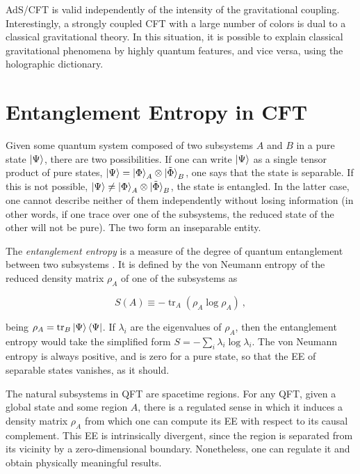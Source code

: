 \documentclass[twocolumn]{revtex4}
\providecommand{\eq}[2]{
    \begin{equation}
        #2
    \label{eq:#1}
    \end{equation}
}
\DeclareMathOperator{\tr}{tr}
\begin{document}
AdS/CFT is valid independently of the intensity of the gravitational coupling. Interestingly, a strongly coupled CFT with a large number of colors is dual to a classical gravitational theory. %
In this situation, it is possible to explain classical gravitational phenomena by highly quantum features, and vice versa, using the holographic dictionary.


\section{Entanglement Entropy in CFT} \label{s:EE_CFT}

Given some quantum system composed of two subsystems $A$ and $B$ in a pure state $\ket{\Psi}$, there are two possibilities. If one can write $\ket{\Psi}$ as a single tensor product of pure states, $\ket{\Psi} = \ket{\Phi}_A \otimes \ket{\tilde{\Phi}}_B$, one says that the state is separable. If this is not possible, $\ket{\Psi} \neq \ket{\Phi}_A \otimes \ket{\tilde{\Phi}}_B$, the state is entangled.
In the latter case, one cannot describe neither of them independently without losing information (in other words, if one trace over one of the subsystems, the reduced state of the other will not be pure). The two form an inseparable entity.

The \emph{entanglement entropy} is a measure of the degree of quantum entanglement between two subsystems \cite{nishioka_entanglement_2018}. It is defined by the von Neumann entropy of the reduced density matrix $\rho_A$ of one of the subsystems as
\eq{EE}{
    S(A) \equiv - \tr_A ( \rho_A \log \rho_A ) \ ,
}
being $\rho_A = \tr_B \ket{\Psi}\bra{\Psi}$. If $\lambda_i$ are the eigenvalues of $\rho_A$, then the entanglement entropy would take the simplified form $S = - \sum_i \lambda_i \log \lambda_i$. The von Neumann entropy is always positive, and is zero for a pure state, so that the EE of separable states vanishes, as it should. 


The natural subsystems in QFT are spacetime regions. For any QFT, given a global state and some region $A$, there is a regulated sense in which it induces a density matrix $\rho_A$ from which one can compute its EE with respect to its causal complement.
This EE is intrinsically divergent, since the region is separated from its vicinity by a zero-dimensional boundary. Nonetheless, one can regulate it and obtain physically meaningful results.
\end{document}
